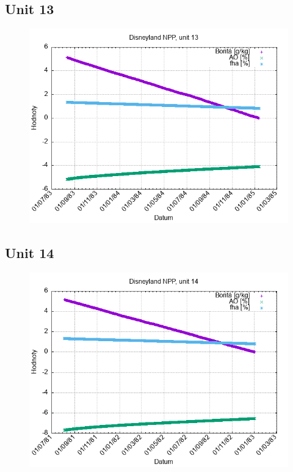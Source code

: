 \documentclass{article}
\begin{document}
\subsection*{Unit 13}
\begin{figure}[h!]
\centering
\includegraphics[width=14cm]{./grafy/Disneyland13.png}
\end{figure}
\clearpage
\subsection*{Unit 14}
\begin{figure}[h!]
\centering
\includegraphics[width=14cm]{./grafy/Disneyland14.png}
\end{figure}
\clearpage
\end{document}
